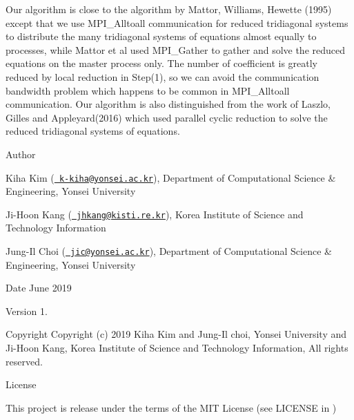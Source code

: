 Our algorithm is close to the algorithm by Mattor, Williams, Hewette (1995) except that we use M\+P\+I\+\_\+\+Alltoall communication for reduced tridiagonal systems to distribute the many tridiagonal systems of equations almost equally to processes, while Mattor et al used M\+P\+I\+\_\+\+Gather to gather and solve the reduced equations on the master process only. The number of coefficient is greatly reduced by local reduction in Step(1), so we can avoid the communication bandwidth problem which happens to be common in M\+P\+I\+\_\+\+Alltoall communication. Our algorithm is also distinguished from the work of Laszlo, Gilles and Appleyard(2016) which used parallel cyclic reduction to solve the reduced tridiagonal systems of equations. \begin{DoxyAuthor}{Author}

\end{DoxyAuthor}

\begin{DoxyItemize}
\item Kiha Kim (\href{mailto:k-kiha@yonsei.ac.kr}{\texttt{ k-\/kiha@yonsei.\+ac.\+kr}}), Department of Computational Science \& Engineering, Yonsei University
\item Ji-\/\+Hoon Kang (\href{mailto:jhkang@kisti.re.kr}{\texttt{ jhkang@kisti.\+re.\+kr}}), Korea Institute of Science and Technology Information
\item Jung-\/\+Il Choi (\href{mailto:jic@yonsei.ac.kr}{\texttt{ jic@yonsei.\+ac.\+kr}}), Department of Computational Science \& Engineering, Yonsei University
\end{DoxyItemize}

\begin{DoxyDate}{Date}
June 2019 
\end{DoxyDate}
\begin{DoxyVersion}{Version}
1. 
\end{DoxyVersion}
\begin{DoxyParagraph}{Copyright}
Copyright (c) 2019 Kiha Kim and Jung-\/\+Il choi, Yonsei University and Ji-\/\+Hoon Kang, Korea Institute of Science and Technology Information, All rights reserved. 
\end{DoxyParagraph}
\begin{DoxyParagraph}{License }

\end{DoxyParagraph}
This project is release under the terms of the M\+IT License (see L\+I\+C\+E\+N\+SE in ) 
